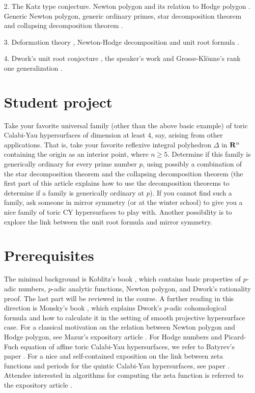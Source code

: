 \documentclass[10XSpt]{article}
\begin{document}
2. The Katz type conjecture. Newton polygon and its relation to Hodge polygon 
\cite{Ma}\cite{AS2}.  
Generic Newton polygon, generic ordinary primes, 
star decomposition theorem \cite{W1} 
and collapsing decomposition theorem \cite{W5}.   

3. Deformation theory \cite{D0}, 
Newton-Hodge decomposition and unit root formula \cite{Ka}\cite{D2}. 

4. Dwork's unit root conjecture \cite{D2}, 
the speaker's work \cite{W3}\cite{W4} and Grosse-Kl\"onne's 
rank one generalization \cite{GK}.  


\section{Student project} 


Take your favorite universal family (other than the above basic example) 
of toric Calabi-Yau hypersurfaces of dimension at least $4$, say, 
arising from other applications. 
That is, take your favorite reflexive 
integral polyhedron $\Delta$ in ${\bf R}^n$ containing the origin as an 
interior point, where $n\geq 5$. 
Determine if this family is generically ordinary 
for every prime number $p$, using possibly a combination of the star 
decomposition theorem and the collapsing decomposition 
theorem \cite{W5} (the first part of this article explains how to 
use the decomposition theorems to determine if a family is generically 
ordinary at $p$).  If you cannot find such a family, 
ask someone in mirror symmetry 
(or at the winter school) to give you a nice family of toric CY hypersurfaces 
to play with. Another possibility is to explore the link between the 
unit root formula and mirror symmetry.  

\section{Prerequisites}

The minimal background is Koblitz's book \cite{Ko}, which 
contains basic properties of $p$-adic numbers, $p$-adic 
analytic functions, Newton polygon, and Dwork's rationality proof.  
The last part will be reviewed in the course. 
A further reading in this direction is Monsky's book \cite{Mo}, which 
explains Dwork's $p$-adic cohomological formula and how to 
calculate it in the setting of smooth projective hypersurface case. 
For a classical motivation on the relation between Newton polygon 
and Hodge polygon, see Mazur's expository article \cite{Ma}.  
For Hodge numbers and Picard-Fuch equation of affine 
toric Calabi-Yau hypersurfaces, we refer to Batyrev's paper \cite{Ba}. 
For a nice and self-contained exposition on the link between 
zeta functions and periods for the quintic Calabi-Yau hypersurfaces, 
see paper \cite{COR}.  
Attendee interested in 
algorithms for computing the zeta function is referred to the 
expository article \cite{W6}. 
\end{document}
